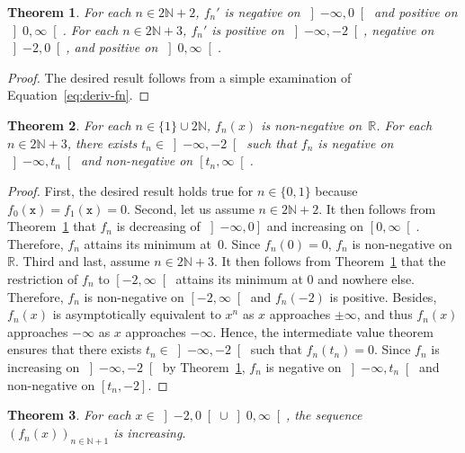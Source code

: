 \documentclass[12pt]{article}
\newcommand{\bR}{\mathbb{R}}
\newcommand{\bN}{\mathbb{N}}
\newcommand{\gtint}[1]{\left] #1, \infty \right[}
\newcommand{\geint}[1]{\left[ #1, \infty \right[}
\newcommand{\ltint}[1]{\left]- \infty, #1 \right[}
\newcommand{\leint}[1]{\left]- \infty, #1 \right]}
\newcommand{\ttx}{\mathtt{x}}
\newtheorem{theorem}{Theorem}
\begin{document}
\begin{theorem} \label{thm:variation}
    For each $n \in 2 \bN + 2$,
    $f_n'$ is
    negative on $\ltint{0}$ and
    positive on $\gtint{0}$.
   For each $n \in 2 \bN + 3$, $f_n'$ is
   positive on $\ltint{- 2}$,
   negative on $\left]- 2, 0 \right[$, and
   positive on $\gtint{0}$.
 \end{theorem}

 \begin{proof}
   The desired result follows from a simple examination of Equation~\eqref{eq:deriv-fn}.
\end{proof} 

 \begin{theorem}%
   \label{thm:Bernoulli}
   For each $n \in \{ 1 \} \cup 2 \bN$,
   $f_n(x)$ is non-negative on~$\bR$. 
   For each  $n \in 2 \bN + 3$,
   there exists $t_n \in  \ltint{-2}$
   such that $f_n$ is negative on $\ltint{t_n}$ and non-negative on $\geint{t_n}$.
 \end{theorem}
 
 \begin{proof}
   First, the desired result holds true for $n \in \{ 0, 1 \}$ because $f_0(\ttx) = f_1(\ttx) = 0$.
   Second, let us assume $n \in  2 \bN + 2$.
   It then follows from Theorem~\ref{thm:variation} that 
   $f_n$ is decreasing of $\leint{0}$ and increasing on $\geint{0}$.
   Therefore, $f_n$ attains its minimum at~$0$.
   Since $f_n(0) = 0$, $f_n$ is non-negative on~$\bR$.
   Third and last, assume $n \in 2 \bN + 3$.
   It then follows from Theorem~\ref{thm:variation} that
   the restriction of $f_n$ to $\geint{-2}$ attains its minimum at $0$
   and nowhere else.
   Therefore, $f_n$ is non-negative on $\geint{- 2}$ and $f_n(- 2)$ is positive.
   Besides, $f_n(x)$ is asymptotically equivalent to $x^n$ as $x$ approaches $\pm \infty$,
   and thus $f_n(x)$ approaches $- \infty$ as $x$ approaches $- \infty$.
   Hence, the intermediate value theorem ensures that there exists $t_n \in \ltint{- 2}$ such that $f_n(t_n) = 0$.
   Since $f_n$ is increasing on $\ltint{- 2}$ by Theorem~\ref{thm:variation},
   $f_n$ is negative on $\ltint{t_n}$ and non-negative on $[t_n, - 2]$.
 \end{proof}

\begin{theorem} \label{thm:increasing-fn}
  For each $x \in \left]- 2, 0 \right[ \cup \gtint{0}$,
  the sequence $\left( f_n(x) \right)_{n \in \bN + 1}$ is increasing.
\end{theorem} 
\end{document}
